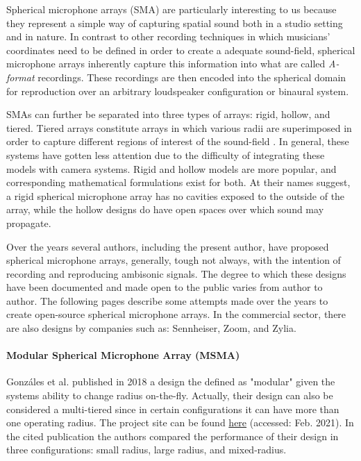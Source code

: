 Spherical microphone arrays (SMA) are particularly interesting to us because they represent a simple way of capturing spatial sound both in a studio setting and in nature. In contrast to other recording techniques in which musicians' coordinates need to be defined in order to create a adequate sound-field, spherical microphone arrays inherently capture this information into what are called \textit{A-format} recordings. These recordings are then encoded into the spherical domain for reproduction over an arbitrary loudspeaker configuration or binaural system. 

SMAs can further be separated into three types of arrays: rigid, hollow, and tiered. Tiered arrays constitute arrays in which various radii are superimposed in order to capture different regions of interest of the sound-field \cite{dabin2015design}. In general, these systems have gotten less attention due to the difficulty of integrating these models with camera systems. Rigid and hollow models are more popular, and corresponding mathematical formulations exist for both. At their names suggest, a rigid spherical microphone array has no cavities exposed to the outside of the array, while the hollow designs do have open spaces over which sound may propagate.


Over the years several authors, including the present author, have proposed spherical microphone arrays, generally, tough not always, with the intention of recording and reproducing ambisonic signals. The degree to which these designs have been documented and made open to the public varies from author to author. The following pages describe some attempts made over the years to create open-source spherical microphone arrays. In the commercial sector, there are also designs by companies such as: Sennheiser, Zoom, and Zylia. 

\paragraph{Modular Spherical Microphone Array (MSMA)}

Gonzáles et al. \cite{gonzalez2018modular} published in 2018 a design the defined as "modular" given the systems ability to change radius on-the-fly. Actually, their design can also be considered a multi-tiered since in certain configurations it can have more than one operating radius. The project site can be found \href{https://www.appropedia.org/Modular_Spherical_Microphone_Array}{here} (accessed: Feb. 2021). In the cited publication the authors compared the performance of their design in three configurations: small radius, large radius, and mixed-radius. 


